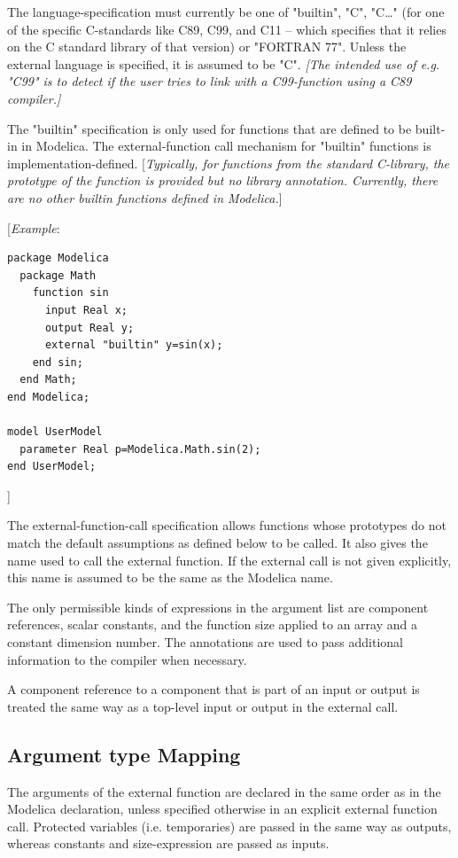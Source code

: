 \documentclass[10pt,a4paper]{report}
\def\doublelabel#1{\label{#1}}
\begin{document}
The language-specification must currently be one of "builtin", "C",
"C\ldots{}" (for one of the specific C-standards like C89, C99, and C11
-- which specifies that it relies on the C standard library of that
version) or "FORTRAN 77". Unless the external language is specified, it
is assumed to be "C". \emph{{[}The intended use of e.g. "C99" is to
detect if the user tries to link with a C99-function using a C89
compiler.{]} }

The "builtin" specification is only used for functions that are defined
to be built-in in Modelica. The external-function call mechanism for
"builtin" functions is implementation-defined. {[}\emph{Typically, for
functions from the standard C-library, the prototype of the function is
provided but no library annotation. Currently, there are no other
builtin functions defined in Modelica.}{]}

{[}\emph{Example}:

\begin{lstlisting}[language=modelica]
package Modelica
  package Math
    function sin
      input Real x;
      output Real y;
      external "builtin" y=sin(x);
    end sin;
  end Math;
end Modelica;

model UserModel
  parameter Real p=Modelica.Math.sin(2);
end UserModel;
\end{lstlisting}
{]}

The external-function-call specification allows functions whose
prototypes do not match the default assumptions as defined below to be
called. It also gives the name used to call the external function. If
the external call is not given explicitly, this name is assumed to be
the same as the Modelica name.

The only permissible kinds of expressions in the argument list are
component references, scalar constants, and the function size applied to
an array and a constant dimension number. The annotations are used to
pass additional information to the compiler when necessary.

A component reference to a component that is part of an input or output
is treated the same way as a top-level input or output in the external
call.

\subsection{Argument type Mapping}\doublelabel{argument-type-mapping}

The arguments of the external function are declared in the same order as
in the Modelica declaration, unless specified otherwise in an explicit
external function call. Protected variables (i.e. temporaries) are
passed in the same way as outputs, whereas constants and size-expression
are passed as inputs.
\end{document}
